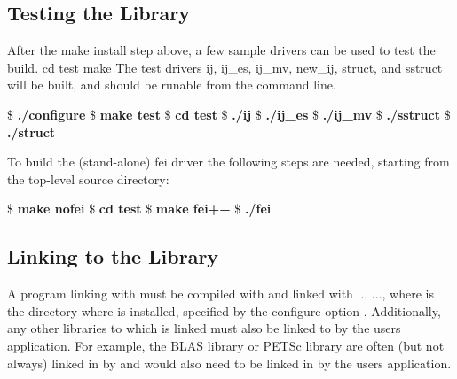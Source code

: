 \subsection{Testing the Library} 
After the make install step above, a few sample
drivers can be used to test the build. cd test make The test drivers ij,
ij\_es, ij\_mv, new\_ij, struct, and sstruct will be built, and should be runable
from the command line. 
\begin{ttfamily}
\begin{mdseries}
\linebreak
\$ \textbf{./configure}\linebreak
\$ \textbf{make test}\linebreak
\$ \textbf{cd test}\linebreak
\$ \textbf{./ij}\linebreak
\$ \textbf{./ij\_es}\linebreak
\$ \textbf{./ij\_mv}\linebreak
\$ \textbf{./sstruct}\linebreak
\$ \textbf{./struct}\linebreak
\linebreak
\end{mdseries}
\end{ttfamily}
To build the (stand-alone) fei driver the following 
steps are needed, starting from the top-level source directory: 
\begin{ttfamily}
\begin{mdseries}
\linebreak
\$ \textbf{make nofei}\linebreak
\$ \textbf{cd test}\linebreak
\$ \textbf{make fei++}\linebreak
\$ \textbf{./fei}\linebreak
\linebreak 
\end{mdseries}
\end{ttfamily}

\subsection{Linking to the Library}

A program linking with \hypre{} must be compiled with
 and linked with
... 
..., where  is the
directory where \hypre{} is installed, specified by the configure
option .  Additionally, any other
libraries to which \hypre{} is linked must also be linked to by the
users application.  For example, the BLAS library or PETSc library are
often (but not always) linked in by \hypre{} and would also need to be
linked in by the users application.

